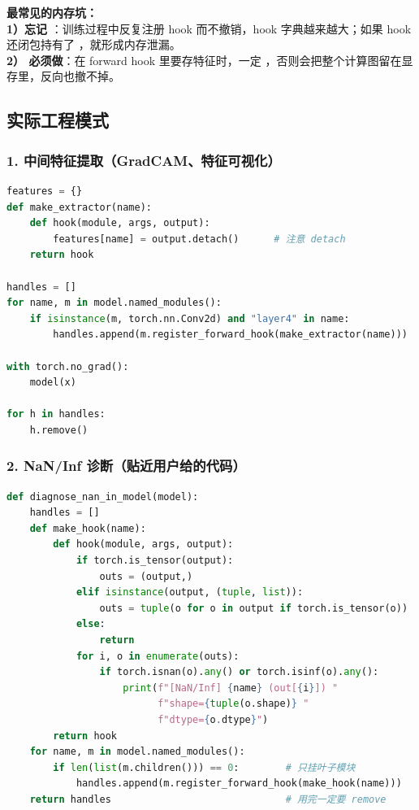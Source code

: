 \begin{warnbox}
\textbf{最常见的内存坑：}\\
\textbf{1）忘记 }：训练过程中反复注册 hook 而不撤销，hook 字典越来越大；如果 hook 还闭包持有了 ，就形成内存泄漏。\\
\textbf{2） 必须做}：在 forward hook 里要存特征时，一定 ，否则会把整个计算图留在显存里，反向也撤不掉。
\end{warnbox}

\subsection{实际工程模式}

\subsubsection{1. 中间特征提取（GradCAM、特征可视化）}

\begin{lstlisting}[language=Python]
features = {}
def make_extractor(name):
    def hook(module, args, output):
        features[name] = output.detach()      # 注意 detach
    return hook

handles = []
for name, m in model.named_modules():
    if isinstance(m, torch.nn.Conv2d) and "layer4" in name:
        handles.append(m.register_forward_hook(make_extractor(name)))

with torch.no_grad():
    model(x)

for h in handles:
    h.remove()
\end{lstlisting}

\subsubsection{2. NaN/Inf 诊断（贴近用户给的代码）}

\begin{lstlisting}[language=Python, caption=诊断哪一层最先出现 NaN/Inf]
def diagnose_nan_in_model(model):
    handles = []
    def make_hook(name):
        def hook(module, args, output):
            if torch.is_tensor(output):
                outs = (output,)
            elif isinstance(output, (tuple, list)):
                outs = tuple(o for o in output if torch.is_tensor(o))
            else:
                return
            for i, o in enumerate(outs):
                if torch.isnan(o).any() or torch.isinf(o).any():
                    print(f"[NaN/Inf] {name} (out[{i}]) "
                          f"shape={tuple(o.shape)} "
                          f"dtype={o.dtype}")
        return hook
    for name, m in model.named_modules():
        if len(list(m.children())) == 0:        # 只挂叶子模块
            handles.append(m.register_forward_hook(make_hook(name)))
    return handles                              # 用完一定要 remove
\end{lstlisting}

